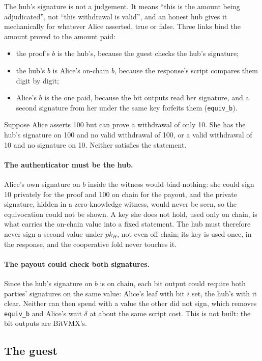 \documentclass[11pt]{article}
\newcommand{\tx}[1]{\texttt{#1}}
\begin{document}
The hub's signature is not a judgement. It means ``this is the amount
being adjudicated'', not ``this withdrawal is valid'', and an honest hub
gives it mechanically for whatever Alice asserted, true or false. Three
links bind the amount proved to the amount paid:
\begin{itemize}[leftmargin=1.5em]
\item the proof's $b$ is the hub's, because the guest checks the hub's
  signature;
\item the hub's $b$ is Alice's on-chain $b$, because the response's
  script compares them digit by digit;
\item Alice's $b$ is the one paid, because the bit outputs read her
  signature, and a second signature from her under the same key forfeits
  them (\tx{equiv\_b}).
\end{itemize}
Suppose Alice asserts 100 but can prove a withdrawal of only 10. She has
the hub's signature on 100 and no valid withdrawal of 100, or a valid
withdrawal of 10 and no signature on 10. Neither satisfies the
statement.

\paragraph{The authenticator must be the hub.} Alice's own signature on
$b$ inside the witness would bind nothing: she could sign 10 privately
for the proof and 100 on chain for the payout, and the private
signature, hidden in a zero-knowledge witness, would never be seen, so
the equivocation could not be shown. A key she does not hold, used only
on chain, is what carries the on-chain value into a fixed statement. The
hub must therefore never sign a second value under $pk_H$, not even off
chain; its key is used once, in the response, and the cooperative fold
never touches it.

\paragraph{The payout could check both signatures.} Since the hub's
signature on $b$ is on chain, each bit output could require both
parties' signatures on the same value: Alice's leaf with bit $i$ set, the
hub's with it clear. Neither can then spend with a value the other did
not sign, which removes \tx{equiv\_b} and Alice's wait $\delta$ at about
the same script cost. This is not built: the bit outputs are BitVMX's.

\subsection{The guest}
\end{document}
